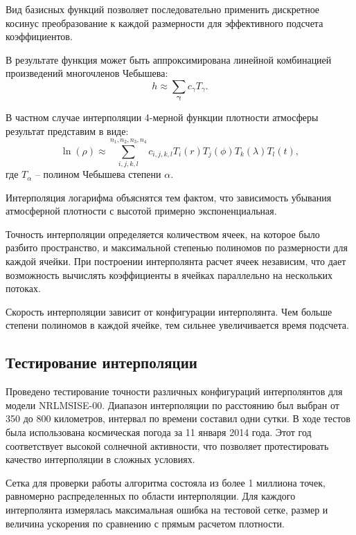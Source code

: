Вид базисных функций позволяет последовательно
применить дискретное косинус преобразование к каждой размерности для эффективного подсчета
коэффициентов. 

В результате функция может быть аппроксимирована линейной комбинацией произведений
многочленов Чебышева:
\begin{equation*}
    h \approx \sum_{\mathbf{\gamma}} c_{\gamma} T_\gamma.
\end{equation*}

В частном случае интерполяции 4-мерной функции плотности атмосферы
результат представим в виде:
\begin{equation*}
    \ln(\rho) \approx \sum_{i,j,k,l}^{n_1, n_2, n_3, n_4} 
    c_{i,j,k,l} T_i(r) T_j(\phi) T_k (\lambda) T_l (t),
\end{equation*}
где $T_\alpha$ -- полином Чебышева степени $\alpha$.

Интерполяция логарифма объяснятся тем фактом, что зависимость убывания
атмосферной плотности с высотой примерно экспоненциальная.

Точность интерполяции определяется количеством ячеек, на которое было разбито пространство,
и максимальной степенью полиномов по размерности для каждой ячейки. При построении
интерполянта расчет ячеек независим, что дает возможность вычислять коэффициенты в ячейках
параллельно на нескольких потоках.

Скорость интерполяции зависит от конфигурации интерполянта. Чем больше степени полиномов в
каждой ячейке, тем сильнее увеличивается время подсчета.

\subsection{Тестирование интерполяции}

Проведено тестирование точности различных конфигураций интерполянтов для модели NRLMSISE-00.
Диапазон интерполяции по расстоянию был выбран от 350 до 800 километров, интервал по времени
составил одни сутки. В ходе тестов была использована космическая погода за 11 января 2014 года.
Этот год соответствует высокой солнечной активности, что позволяет протестировать качество
интерполяции в сложных условиях.

Сетка для проверки работы алгоритма состояла из более 1 миллиона точек, равномерно
распределенных по области интерполяции. Для каждого интерполянта измерялась максимальная
ошибка на тестовой сетке, размер и величина ускорения по сравнению с прямым расчетом плотности.

